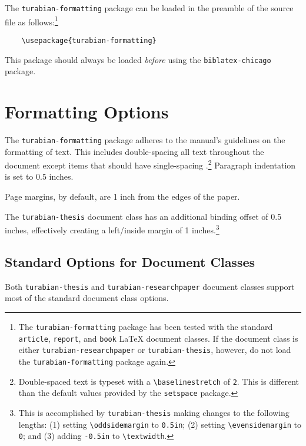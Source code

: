 \documentclass{article}
\begin{document}
%
The \texttt{turabian-formatting} package can be loaded in the preamble of the source file as follows:\footnote{%
	The \texttt{turabian-formatting} package has been tested with the standard \texttt{article}, \texttt{report}, and \texttt{book} \LaTeX{} document classes. If the document class is either \texttt{turabian-researchpaper} or \texttt{turabian-thesis}, however, do not load the \texttt{turabian-formatting} package again.}

\begin{lstlisting}
	\usepackage{turabian-formatting}
\end{lstlisting}

This package should always be loaded \emph{before} using the \texttt{biblatex-chicago} package.


\section{Formatting Options}
\label{sec:formatting_options}

The \texttt{turabian-formatting} package adheres to the manual's guidelines on the formatting of text. This includes double-spacing all text throughout the document except items that should have single-spacing \autocite[373]{turabian_manual_2013}.\footnote{%
	Double-spaced text is typeset with a \texttt{\textbackslash baselinestretch} of \texttt{2}. This is different than the default values provided by the \texttt{setspace} package.}
Paragraph indentation is set to 0.5 inches.

Page margins, by default, are 1 inch from the edges of the paper.

The \texttt{turabian-thesis} document class has an additional binding offset of 0.5 inches, effectively creating a left/inside margin of 1 inches.\footnote{%
	This is accomplished by \texttt{turabian-thesis} making changes to the following lengths: (1) setting \texttt{\textbackslash oddsidemargin} to \texttt{0.5in}; (2) setting \texttt{\textbackslash evensidemargin} to \texttt{0}; and (3) adding \texttt{-0.5in} to \texttt{\textbackslash textwidth}.}


\subsection{Standard Options for Document Classes}
Both \texttt{turabian-thesis} and \texttt{turabian-researchpaper} document classes support most of the standard document class options.
\end{document}
